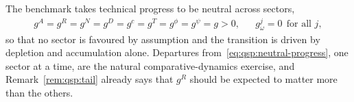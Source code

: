  The benchmark takes technical progress to be neutral across sectors,
\begin{align}
g^A=g^R=g^N=g^D=g^c=g^T=g^\phi=g^\psi=g>0,
&&
g^j_\omega=0 \ \ \text{for all }j,
\label{eq:qsp:neutral-progress}
\end{align}
so that no sector is favoured by assumption and the transition is driven by depletion and accumulation
alone. Departures from~\eqref{eq:qsp:neutral-progress}, one sector at a time, are the natural
comparative-dynamics exercise, and Remark~\ref{rem:qsp:tail} already says that $g^R$ should be expected
to matter more than the others.
